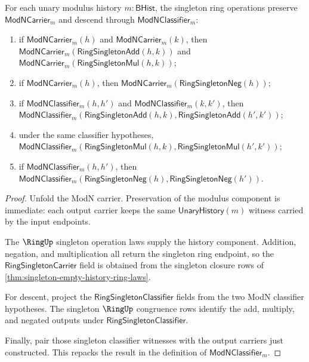 \begin{theorem}
\label{thm:modn-singleton-operation-descent-rows}
For each unary modulus history $m:\mathsf{BHist}$, the singleton ring
operations preserve $\mathsf{ModNCarrier}_m$ and descend through
$\mathsf{ModNClassifier}_m$:
\begin{enumerate}
  \item if $\mathsf{ModNCarrier}_m(h)$ and
  $\mathsf{ModNCarrier}_m(k)$, then
  $\mathsf{ModNCarrier}_m(\mathsf{RingSingletonAdd}(h,k))$ and
  $\mathsf{ModNCarrier}_m(\mathsf{RingSingletonMul}(h,k))$;
  \item if $\mathsf{ModNCarrier}_m(h)$, then
  $\mathsf{ModNCarrier}_m(\mathsf{RingSingletonNeg}(h))$;
  \item if $\mathsf{ModNClassifier}_m(h,h')$ and
  $\mathsf{ModNClassifier}_m(k,k')$, then
  $\mathsf{ModNClassifier}_m(\mathsf{RingSingletonAdd}(h,k),
  \mathsf{RingSingletonAdd}(h',k'))$;
  \item under the same classifier hypotheses,
  $\mathsf{ModNClassifier}_m(\mathsf{RingSingletonMul}(h,k),
  \mathsf{RingSingletonMul}(h',k'))$;
  \item if $\mathsf{ModNClassifier}_m(h,h')$, then
  $\mathsf{ModNClassifier}_m(\mathsf{RingSingletonNeg}(h),
  \mathsf{RingSingletonNeg}(h'))$.
\end{enumerate}
\end{theorem}
\begin{proof}
Unfold the ModN carrier. Preservation of the modulus component is immediate:
each output carrier keeps the same $\mathsf{UnaryHistory}(m)$ witness carried by
the input endpoints.

The $\RingUp$ singleton operation laws supply the history component. Addition,
negation, and multiplication all return the singleton ring endpoint, so the
$\mathsf{RingSingletonCarrier}$ field is obtained from the singleton closure
rows of \autoref{thm:singleton-empty-history-ring-laws}.

For descent, project the $\mathsf{RingSingletonClassifier}$ fields from the two
ModN classifier hypotheses. The singleton $\RingUp$ congruence rows identify
the add, multiply, and negated outputs under
$\mathsf{RingSingletonClassifier}$.

Finally, pair those singleton classifier witnesses with the output carriers
just constructed. This repacks the result in the definition of
$\mathsf{ModNClassifier}_m$.
\end{proof}

